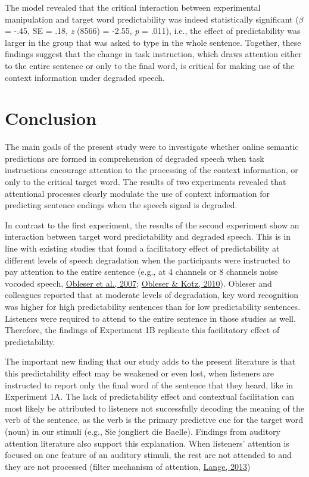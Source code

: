 \documentclass[a4paper, nobind]{templates/ociamthesis}
\begin{document}
The model revealed that the critical interaction between experimental manipulation and target word predictability was indeed statistically significant (\(\beta\) = -.45, SE = .18, \emph{z} (8566) = -2.55, \emph{p} = .011), i.e., the effect of predictability was larger in the group that was asked to type in the whole sentence.
Together, these findings suggest that the change in task instruction, which draws attention either to the entire sentence or only to the final word, is critical for making use of the context information under degraded speech.

\hypertarget{conclusion}{%
\section{Conclusion}\label{conclusion}}

The main goals of the present study were to investigate whether online semantic predictions are formed in comprehension of degraded speech when task instructions encourage attention to the processing of the context information, or only to the critical target word.
The results of two experiments revealed that attentional processes clearly modulate the use of context information for predicting sentence endings when the speech signal is degraded.

In contrast to the first experiment, the results of the second experiment show an interaction between target word predictability and degraded speech.
This is in line with existing studies that found a facilitatory effect of predictability at different levels of speech degradation when the participants were instructed to pay attention to the entire sentence (e.g., at 4 channels or 8 channels noise vocoded speech, \protect\hyperlink{ref-Obleser2007}{Obleser et al., 2007}; \protect\hyperlink{ref-Obleser2010}{Obleser \& Kotz, 2010}).
Obleser and colleagues reported that at moderate levels of degradation, key word recognition was higher for high predictability sentences than for low predictability sentences.
Listeners were required to attend to the entire sentence in those studies as well.
Therefore, the findings of Experiment 1B replicate this facilitatory effect of predictability.

The important new finding that our study adds to the present literature is that this predictability effect may be weakened or even lost, when listeners are instructed to report only the final word of the sentence that they heard, like in Experiment 1A.
The lack of predictability effect and contextual facilitation can most likely be attributed to listeners not successfully decoding the meaning of the verb of the sentence, as the verb is the primary predictive cue for the target word (noun) in our stimuli (e.g., Sie jongliert die Baelle).
Findings from auditory attention literature also support this explanation.
When listeners' attention is focused on one feature of an auditory stimuli, the rest are not attended to and they are not processed (filter mechanism of attention, \protect\hyperlink{ref-Lange2013}{Lange, 2013})
\end{document}
